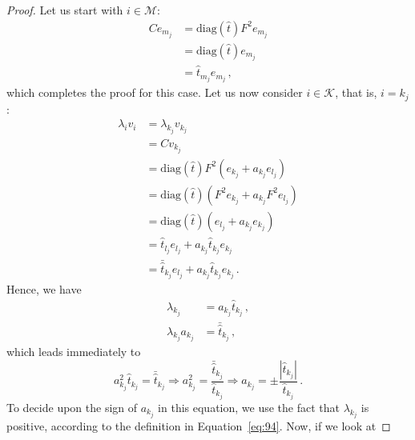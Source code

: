 \begin{proof}[Proof]
  Let us start with $i\in\mathcal{M}$:
  \begin{equation}
    \label{eq:98}
    \begin{split}
      Ce_{m_{j}}
      & = \mathrm{diag}(\hat{t})F^{2}e_{m_{j}}\\
      & = \mathrm{diag}(\hat{t})e_{m_{j}}\\
      & = \hat{t}_{m_{j}}e_{m_{j}} \,,
    \end{split}
  \end{equation}
  which completes the proof for this case. Let us now consider
  $i\in\mathcal{K}$, that is, $i=k_{j}$:
  \begin{equation}
    \label{eq:99}
    \begin{split}
      \lambda_{i}v_{i}
      & = \lambda_{k_{j}}v_{k_{j}} \\
      & = Cv_{k_{j}}\\
      & = \mathrm{diag}(\hat{t})F^{2}(e_{k_{j}} + a_{k_{j}} e_{l_{j}})\\
      & = \mathrm{diag}(\hat{t})(F^{2}e_{k_{j}} +
      a_{k_{j}}F^{2}e_{l_j})\\
      & =  \mathrm{diag}(\hat{t})(e_{l_{j}} + a_{k_{j}}e_{k_{j}})\\
      & = \hat{t}_{l_{j}} e_{l_{j}} +
      a_{k_{j}}\hat{t}_{k_{j}}e_{k_{j}} \\
      & = \bar{\hat{t}}_{k_{j}} e_{l_{j}} +
      a_{k_{j}}\hat{t}_{k_{j}}e_{k_{j}} \,. 
    \end{split}
  \end{equation}
  Hence, we have
  \begin{equation}
    \label{eq:100}
    \begin{split}
      \lambda_{k_{j}} & = a_{k_{j}}\hat{t}_{k_{j}} \,, \\
      \lambda_{k_{j}} a_{k_{j}} & = \bar{\hat{t}}_{k_{j}} \,,
    \end{split}
  \end{equation}
  which leads immediately to
  \begin{equation}
    \label{eq:101}
    a^{2}_{k_{j}}\hat{t}_{k_{j}} =  \bar{\hat{t}}_{k_{j}}
    \Rightarrow
    a^{2}_{k_{j}} = \frac{\bar{\hat{t}}_{k_{j}}}{\hat{t}_{k_{j}}}
    \Rightarrow
    a_{k_{j}} =  \pm \frac{|\hat{t}_{k_{j}}|}{\hat{t}_{k_{j}}}
    \,. 
  \end{equation}
  To decide upon the sign of $a_{k_{j}}$ in this equation, we use the
  fact that  $\lambda_{k_{j}}$ is positive, according to the
  definition in Equation~\eqref{eq:94}.  Now, if we look at

\end{proof}
